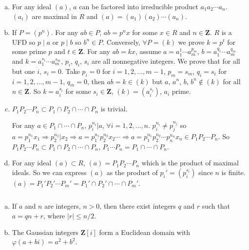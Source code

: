 \begin{answer}
    \begin{enumerate}[(a)]
        \item For any ideal $(a)$, $a$ can be factored into irreducible product $a_{1}a_{2}\cdots a_{n}$. $(a_{i})$ are maximal in $R$ and $(a)=(a_{1})(a_{2})\cdots(a_{n})$.
        \item If $P=(p^{n})$. For any $ab\in P$, $ab=p^{n}x$ for some $x\in R$ and $n\in\mathbf{Z}$. $R$ is a UFD so $p\mid a$ or $p\mid b$ so $b^{n}\in P$. Conversely, $\forall P=(k)$ we prove $k=p^{t}$ for some prime $p$ and $t\in \mathbf{Z}$. For any $ab=kx$, assume $a=a_{1}^{1}\cdots a_{m}^{p_{m}}$, $b=a_{1}^{q_{1}}\cdots a_{m}^{q_{m}}$ and $k=a_{1}^{s_{1}}\cdots a_{m}^{s_{m}}$, $p_{i}$, $q_{i}$, $s_{i}$ are all nonnegative integers. We prove that for all but one $i$, $s_{i}=0$. Take $p_{i}=0$ for $i=1,2,\dots, m-1$, $p_{m}=s_{m}$, $q_{i}=s_{i}$ for $i=1,2,\dots,m-1$, $q_{m}=0$, then $ab=k\in (k)$ but $a$, $a^{n}$, $b$, $b^{n}\notin (k)$ for all $n\in \mathbf{Z}$. So $k=a_{i}^{s_{i}}$ for some $s_{i}\in \mathbf{Z}$, $(k)=(a_{i}^{s_{i}})$, $a_{i}$ prime.
        \item $P_{1}P_{2}\cdots P_{n}\subset P_{1}\cap P_{2}\cap \cdots\cap P_{n}$ is trivial.
        
        For any $a\in P_{1}\cap \cdots\cap P_{n}$, $p_{i}^{n_{i}}|a$, $\forall i=1,2,\dots, n$. $p_{i}^{n_{i}}\neq p_{j}^{n_{j}}$ so $a=p_{1}^{n_{1}}x_{1}\Rightarrow p_{2}^{n_{2}}|x_{2}\Rightarrow a=p_{1}^{n_{1}}p_{2}^{n_{2}}x_{2}\cdots\Rightarrow a=p_{1}^{n_{1}}p_{2}^{n_{2}}\cdots p_{n}^{n_{n}}x_{n}\in P_{1}P_{2}\cdots P_{n}$. So $P_{1}P_{2}\cdots P_{n}\subset P_{1}\cap P_{2}\cap \cdots\cap P_{n}$, $P_{1}\cdots P_{n}=P_{1}\cap\cdots\cap P_{n}$.
        \item For any ideal $(a)\subset R$, $(a)=P_{1}P_{2}\cdots P_{n}$ which is the product of maximal ideals. So we can express $(a)$ as the product of $p_{i}'=(p_{i}^{s_{i}})$ since $n$ is finite. $(a)=P_{1}'P_{2}'\cdots P_{m}'=P_{1}'\cap P_{2}'\cap \cdots\cap P_{m}'$.
    \end{enumerate}
\end{answer}

$$ $$

\begin{ex}
    \begin{enumerate}[(a)]
        \item If $a$ and $n$ are integers, $n>0$, then there exist integers $q$ and $r$ such that $a=qn+r$, where $\left| r \right| \leq n /2$.
        \item The Gaussian integers $\mathbf{Z}[i]$ form a Euclidean domain with $\varphi(a+bi)=a^{2}+b^{2}$.
    \end{enumerate}
\end{ex}

